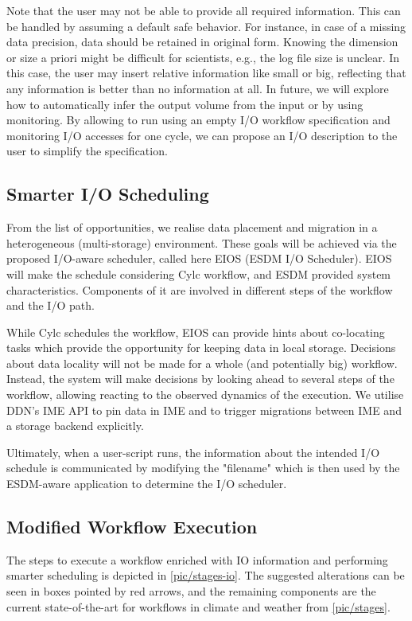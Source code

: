 \documentclass{superfri}
\begin{document}
Note that the user may not be able to provide all required information.
This can be handled by assuming a default safe behavior.
For instance, in case of a missing data precision, data should be retained in original form.
Knowing the dimension or size a priori might be difficult for scientists, e.g., the log file size is unclear.
In this case, the user may insert relative information like small or big, reflecting that any information is better than no information at all.
In future, we will explore how to automatically infer the output volume from the input or by using monitoring.
By allowing to run using an empty I/O workflow specification and monitoring I/O accesses for one cycle, we can propose an I/O description to the user to simplify the specification.

\subsection{Smarter I/O Scheduling}

From the list of opportunities, we realise data placement and migration in a heterogeneous (multi-storage) environment.
These goals will be achieved via the proposed I/O-aware scheduler, called here EIOS (ESDM I/O Scheduler).
EIOS will make the schedule considering Cylc workflow, and ESDM provided system characteristics.
Components of it are involved in different steps of the workflow and the I/O path.

While Cylc schedules the workflow, EIOS can provide hints about co-locating tasks which provide the opportunity for keeping data in local storage.
Decisions about data locality will not be made for a whole (and potentially big) workflow.
Instead, the system will make decisions by looking ahead to several steps of the workflow, allowing reacting to the observed dynamics of the execution.
We utilise DDN's IME API to pin data in IME and to trigger migrations between IME and a storage backend explicitly.

Ultimately, when a user-script runs, the information about the intended I/O schedule is communicated by modifying the "filename" which is then used by the ESDM-aware application to determine the I/O scheduler.

\subsection{Modified Workflow Execution}

The steps to execute a workflow enriched with IO information and performing smarter scheduling is depicted in \cref{pic/stages-io}.
The suggested alterations can be seen in boxes pointed by red arrows, and the remaining components are the current state-of-the-art for workflows in climate and weather from \cref{pic/stages}.
\end{document}
